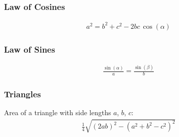 \documentclass[12pt]{article}
\begin{document}
\subsubsection*{Law of Cosines}
\begin{align*}
a^2 = b^2 + c^2 - 2bc\, \cos(\alpha)
\end{align*}

\subsubsection*{Law of Sines}
\begin{align*}
\frac{\sin(\alpha)}{a} = \frac{\sin(\beta)}{b} 
\end{align*}

\subsubsection*{Triangles}
Area of a triangle with side lengths $a$, $b$, $c$:
\begin{align*}
\frac{1}{4} \sqrt{(2ab)^2 - \left(a^2+b^2-c^2\right)^2}
\end{align*}
\end{document}
